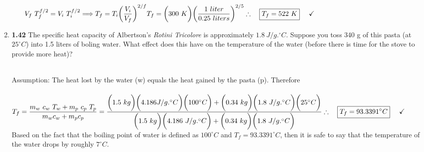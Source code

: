 \documentclass[fleqn]{article}
\begin{document}
\begin{enumerate}
\begin{enumerate}
        \textcolor{hwColor}{
          \\
          $
            V_f ~ T^{f/2}_f=V_i ~ T^{f/2}_i \Longrightarrow T_f=T_i \bigg( \dfrac{V_i}{V_f} \bigg)^{2/f}
            \\
            \\
            \\
            T_f=\bigg( 300 ~ K \bigg) \bigg( \dfrac{1 ~ liter}{0.25 ~ liters} \bigg)^{2/5}
            \\
            \\
            \\
            \therefore ~~~ \boxed{
              T_f=522 ~ K
            } ~~~~ \checkmark
            \\
            \\
          $
        }

    \end{enumerate}

    \item \textbf{1.42} The specific heat capacity of Albertson's \emph{Rotini Tricolore} is approximately $1.8 ~ J/g.^{\circ}C$. Suppose 
    you toss 340 g of this pasta (at $25^{\circ}C$) into 1.5 liters of boling water. What effect does this have on the temperature of the
    water (before there is time for the stove to provide more heat)?

      \textcolor{hwColor}{
        \\
        Assumption: The heat lost by the water (w) equals the heat gained by the pasta (p). Therefore
        \\
        \\
        $
          T_f=\dfrac{
            m_w ~ c_w ~ T_w + m_p ~ c_p ~ T_p
          }{
            m_w c_w+m_p c_p
          }
          =\dfrac{
            \bigg( 1.5 ~ kg \bigg) \bigg( 4.186 J/g.^{\circ} C \bigg) \bigg( 100^{\circ} C\bigg)+ \bigg( 0.34 ~ kg \bigg) \bigg( 1.8 ~ J/g.^{\circ} C \bigg) \bigg( 25^{\circ} C \bigg)
          }{
            \bigg( 1.5 ~ kg \bigg) \bigg( 4.186 ~ J/g.^{\circ} C \bigg) + \bigg( 0.34 ~ kg \bigg) \bigg( 1.8 ~ J/g.^{\circ} C \bigg)
          }
          \\
          \\
          \\
          \therefore ~~~ \boxed{
            T_f=93.3391^{\circ}C
          } ~~~~ \checkmark
          \\
          \\
        $
        Based on the fact that the boiling point of water is defined as $100^{\circ}C$ and $T_f=93.3391^{\circ}C$, then
        it is safe to say that the temperature of the water drops by roughly $7^{\circ}C$.
      }

  \end{enumerate}
\end{document}
